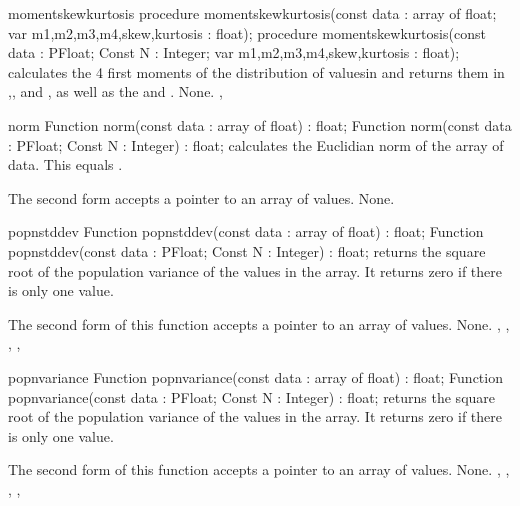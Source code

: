 

\begin{procedure}{momentskewkurtosis}
\Declaration
procedure momentskewkurtosis(const data : array of float;
  var m1,m2,m3,m4,skew,kurtosis : float);
procedure momentskewkurtosis(const data : PFloat; Const N : Integer;
  var m1,m2,m3,m4,skew,kurtosis : float);
\Description
{} calculates the 4 first moments of the distribution
of valuesin  and returns them in ,, and
, as well as the  and .
\Errors
None.
\SeeAlso
{}, 
\end{procedure}


\begin{function}{norm}
\Declaration
Function norm(const data : array of float) : float;
Function norm(const data : PFloat; Const N : Integer) : float;
\Description
{} calculates the Euclidian norm of the array of data.
This equals .

The second form accepts a pointer to an array of  values.
\Errors
None.
\SeeAlso
{}
\end{function}



\begin{function}{popnstddev}
\Declaration
Function popnstddev(const data : array of float) : float;
Function popnstddev(const data : PFloat; Const N : Integer) : float;
\Description
{} returns the square root of the population variance of
the values in the   array. It returns zero if there is only one value.

The second form of this function accepts a pointer to an array of 
values.
\Errors
None.
\SeeAlso
{}, , , ,
\end{function}



\begin{function}{popnvariance}
\Declaration
Function popnvariance(const data : array of float) : float;
Function popnvariance(const data : PFloat; Const N : Integer) : float;
\Description
{} returns the square root of the population variance of
the values in the   array. It returns zero if there is only one value.

The second form of this function accepts a pointer to an array of 
values.
\Errors
None.
\SeeAlso
{}, , , ,
\end{function}

